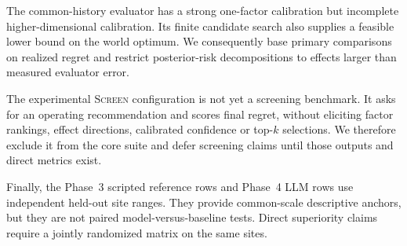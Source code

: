 The common-history evaluator has a strong one-factor calibration but incomplete
higher-dimensional calibration. Its finite candidate search also supplies a feasible lower
bound on the world optimum. We consequently base primary comparisons on realized regret and
restrict posterior-risk decompositions to effects larger than measured evaluator error.

The experimental \textsc{Screen} configuration is not yet a screening benchmark. It asks
for an operating recommendation and scores final regret, without eliciting factor rankings,
effect directions, calibrated confidence or top-$k$ selections. We therefore exclude it
from the core suite and defer screening claims until those outputs and direct metrics exist.

Finally, the Phase~3 scripted reference rows and Phase~4 LLM rows use independent held-out
site ranges. They provide common-scale descriptive anchors, but they are not paired
model-versus-baseline tests. Direct superiority claims require a jointly randomized matrix
on the same sites.
